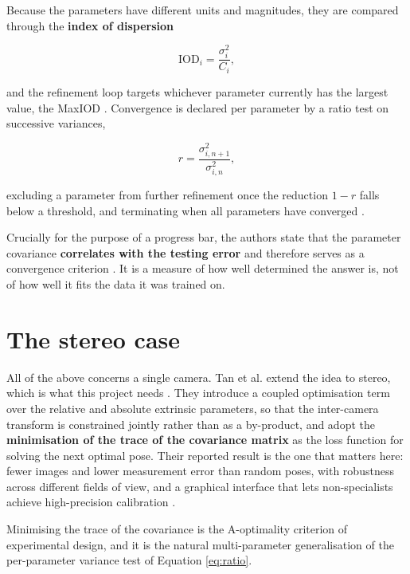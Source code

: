 Because the parameters have different units and magnitudes, they are compared through the \textbf{index of dispersion}

\begin{equation}
\mathrm{IOD}_i = \frac{\sigma_i^2}{C_i} ,
\label{eq:iod}
\end{equation}

and the refinement loop targets whichever parameter currently has the largest value, the MaxIOD \cite{rojtberg2018pose}. Convergence is declared per parameter by a ratio test on successive variances,

\begin{equation}
r = \frac{\sigma^2_{i,n+1}}{\sigma^2_{i,n}} ,
\label{eq:ratio}
\end{equation}

excluding a parameter from further refinement once the reduction $1 - r$ falls below a threshold, and terminating when all parameters have converged \cite{rojtberg2018pose}.

Crucially for the purpose of a progress bar, the authors state that the parameter covariance \textbf{correlates with the testing error} and therefore serves as a convergence criterion \cite{rojtberg2018pose}. It is a measure of how well determined the answer is, not of how well it fits the data it was trained on.

\section{The stereo case}

All of the above concerns a single camera. Tan et al. extend the idea to stereo, which is what this project needs \cite{tan2025stereoposes}. They introduce a coupled optimisation term over the relative and absolute extrinsic parameters, so that the inter-camera transform is constrained jointly rather than as a by-product, and adopt the \textbf{minimisation of the trace of the covariance matrix} as the loss function for solving the next optimal pose. Their reported result is the one that matters here: fewer images and lower measurement error than random poses, with robustness across different fields of view, and a graphical interface that lets non-specialists achieve high-precision calibration \cite{tan2025stereoposes}.

Minimising the trace of the covariance is the A-optimality criterion of experimental design, and it is the natural multi-parameter generalisation of the per-parameter variance test of Equation \ref{eq:ratio}.

